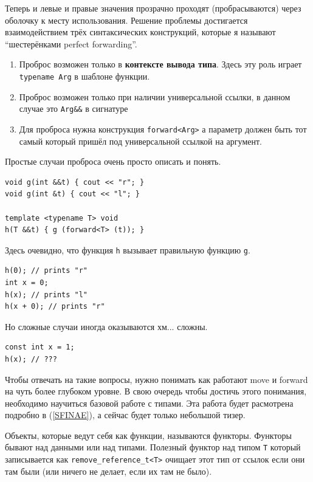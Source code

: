 \documentclass[a4paper,12pt,oneside]{book}
\begin{document}
Теперь и левые и правые значения прозрачно проходят (пробрасываются) через оболочку к месту использования. Решение проблемы достигается взаимодействием трёх синтаксических конструкций, которые я называют ``шестерёнками perfect forwarding''.

\begin{enumerate}
\item Проброс возможен только в \textbf{контексте вывода типа}. Здесь эту роль играет \lstinline!typename Arg! в шаблоне функции.
\item Проброс возможен только при наличии универсальной ссылки, в данном случае это \lstinline!Arg&&! в сигнатуре
\item Для проброса нужна конструкция \lstinline!forward<Arg>! а параметр должен быть тот самый который пришёл под универсальной ссылкой на аргумент.
\end{enumerate}

Простые случаи проброса очень просто описать и понять.

\begin{lstlisting}
void g(int &&t) { cout << "r"; }
void g(int &t) { cout << "l"; }

template <typename T> void 
h(T &&t) { g (forward<T> (t)); }
\end{lstlisting}

Здесь очевидно, что функция \lstinline!h! вызывает правильную функцию \lstinline!g!.

\begin{lstlisting}
h(0); // prints "r"
int x = 0; 
h(x); // prints "l"
h(x + 0); // prints "r"
\end{lstlisting}

Но сложные случаи иногда оказываются хм... сложны.

\begin{lstlisting}
const int x = 1;
h(x); // ???
\end{lstlisting}

Чтобы отвечать на такие вопросы, нужно понимать как работают move и forward на чуть более глубоком уровне. В свою очередь чтобы достичь этого понимания, необходимо научиться базовой работе с типами. Эта работа будет расмотрена подробно в (\ref{SFINAE}), а сейчас будет только небольшой тизер.

Объекты, которые ведут себя как функции, называются функторы. Функторы бывают над данными или над типами. Полезный функтор над типом \lstinline!T! который записывается как \lstinline!remove_reference_t<T>! очищает этот тип от ссылок если они там были (или ничего не делает, если их там не было).
\end{document}
